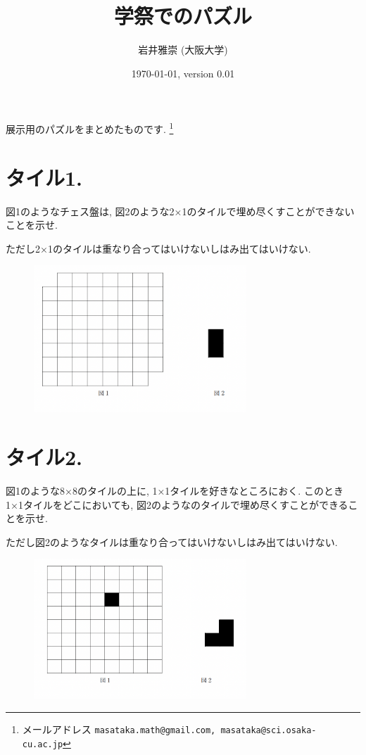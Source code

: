 \documentclass[dvipdfmx,a4paper,12pt]{article} %
\title{学祭でのパズル}
\author{岩井雅崇 (大阪大学)}
\date{\today, version 0.01}
\theoremstyle{definition}
\theoremstyle{remark}
\numberwithin{equation}{section}
\begin{document}
\maketitle 

展示用のパズルをまとめたものです. 
\footnote{メールアドレス {\tt masataka.math@gmail.com, masataka@sci.osaka-cu.ac.jp}}

\section{タイル1. }
図1のようなチェス盤は, 図2のような2×1のタイルで埋め尽くすことができないことを示せ.

ただし2×1のタイルは重なり合ってはいけないしはみ出てはいけない.
\begin{figure}[htbp]
\begin{center}
\includegraphics[width=80mm]{tile1.png}
\end{center}
\end{figure}


\section{タイル2. }
図1のような8×8のタイルの上に, 1×1タイルを好きなところにおく. 
このとき1×1タイルをどこにおいても, 図2のようなのタイルで埋め尽くすことができることを示せ.

ただし図2のようなタイルは重なり合ってはいけないしはみ出てはいけない.
\begin{figure}[htbp]
\begin{center}
\includegraphics[width=80mm]{tile2.png}
\end{center}
\end{figure}
\end{document}
